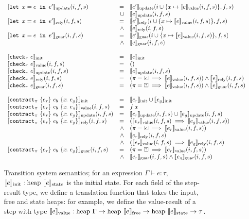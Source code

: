 \documentclass[a4paper,UKenglish,cleveref, autoref, thm-restate,anonymous]{lipics-v2021}
\begin{document}
\begin{figure}
\[\begin{array}{lrl}
    \sysupdate{\xlet{x}{e}{e'}}(i, f, s) & = & \sysupdate{e'}(i \cup \{ x \mapsto \sysvalue{e}(i, f, s)\}, f, s) \\
      & \cup & \sysupdate{e}(i, f, s) \\
    \sysrely{\xlet{x}{e}{e'}}(i, f, s) & = & \sysrely{e'}(i \cup \{ x \mapsto \sysvalue{e}(i, f, s)\}, f, s) \\
      & \wedge & \sysrely{e}(i, f, s) \\
    \sysguar{\xlet{x}{e}{e'}}(i, f, s) & = & \sysguar{e'}(i \cup \{ x \mapsto \sysvalue{e}(i, f, s)\}, f, s) \\
      & \wedge & \sysguar{e}(i, f, s) \\
    \\
    \sysinit{\xcheckP{\PStatus}{e}} & = & \sysinit{e} \\
    \sysvalue{\xcheckP{\PStatus}{e}}(i, f, s) & = & () \\
    \sysupdate{\xcheckP{\PStatus}{e}}(i, f, s) & = & \sysupdate{e}(i, f, s) \\
    \sysrely{\xcheckP{\PStatus}{e}}(i, f, s) & = & (\PStatus = \PSValid \implies \sysvalue{e}(i, f, s)) \wedge \sysrely{e}(i, f, s) \\
    \sysguar{\xcheckP{\PStatus}{e}}(i, f, s) & = & (\PStatus = \PSUnknown \implies \sysvalue{e}(i, f, s)) \wedge \sysguar{e}(i, f, s) \\
    \\
    \sysinit{\xctr} & = & \sysinit{e_r} \cup \sysinit{e_g} \\
    \sysvalue{\xctr}(i, f, s) & = & f.x \\
    \sysupdate{\xctr}(i, f, s) & = & \sysupdate{e_r}(i, f, s) \cup \sysupdate{e_g}(i, f, s) \\
    \sysrely{\xctr}(i, f, s) & = & (\sysvalue{e_r}(i, f, s) \implies \sysvalue{e_g}(i, f, s)) \\
                            & \wedge & (\PStatus = \PSValid \implies \sysvalue{e_r}(i, f, s)) \\
                            & \wedge & \sysrely{e_r}(i, f, s) \\
                            & \wedge & (\sysvalue{e_r}(i, f, s) \implies \sysrely{e_g}(i, f, s) \\
    \sysguar{\xctr}(i, f, s) & = & (\PStatus = \PSUnknown \implies \sysvalue{e_r}(i, f, s)) \\
    & \wedge & \sysguar{e_r}(i, f, s) \wedge \sysguar{e_g}(i, f, s) \\
\end{array}
  \]
  \caption{Transition system semantics; for an expression $\Gamma \vdash e: \tau$, $\llbracket e \rrbracket_{\text{init}} : \text{heap~}\llbracket e \rrbracket_{\text{state}}$ is the initial state. For each field of the step-result type, we define a translation function that takes the input, free and state heaps: for example, we define the value-result of a step with type $\llbracket e \rrbracket_{\text{value}}: \text{heap~}\Gamma \to \text{heap~}\llbracket e \rrbracket_{\text{free}} \to \text{heap~}\llbracket e \rrbracket_{\text{state}} \to \tau$.}
  \label{f:system-translation}
\end{figure} 
\end{document}
